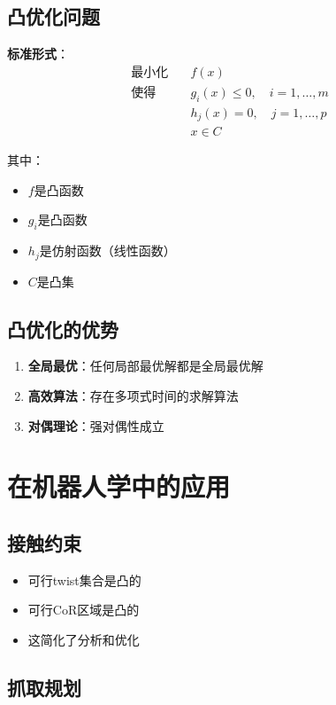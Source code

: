 \documentclass[12pt,a4paper]{article}
\begin{document}
\subsection{凸优化问题}

\textbf{标准形式}：
\begin{align}
\text{最小化} \quad & f(x) \\
\text{使得} \quad & g_i(x) \leq 0, \quad i = 1, \ldots, m \\
& h_j(x) = 0, \quad j = 1, \ldots, p \\
& x \in C
\end{align}

其中：
\begin{itemize}
\item $f$是凸函数
\item $g_i$是凸函数
\item $h_j$是仿射函数（线性函数）
\item $C$是凸集
\end{itemize}

\subsection{凸优化的优势}

\begin{enumerate}
\item \textbf{全局最优}：任何局部最优解都是全局最优解
\item \textbf{高效算法}：存在多项式时间的求解算法
\item \textbf{对偶理论}：强对偶性成立
\end{enumerate}

\section{在机器人学中的应用}

\subsection{接触约束}

\begin{itemize}
\item 可行twist集合是凸的
\item 可行CoR区域是凸的
\item 这简化了分析和优化
\end{itemize}

\subsection{抓取规划}
\end{document}
